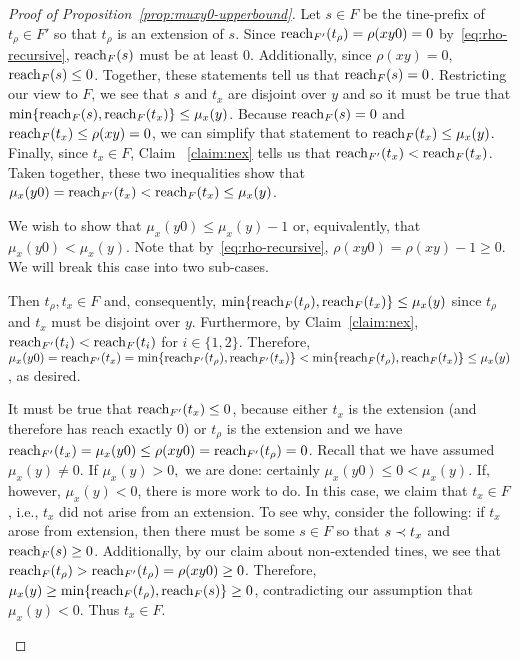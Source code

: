 \begin{proof}[Proof of Proposition~\ref{prop:muxy0-upperbound}]
    Let $s \in F$ be the tine-prefix of $t_\rho \in F'$ so that 
    $t_\rho$ is an extension of $s$. 
    Since $\operatorname{reach}_{F'}(t_\rho) = \rho(xy0) = 0$ by~\eqref{eq:rho-recursive}, 
    $\operatorname{reach}_F(s)$ must be at least 0. 
    Additionally, since $\rho(xy)=0$, $\operatorname{reach}_F(s) \leq 0$. 
    Together, these statements tell us that $\operatorname{reach}_F(s)=0$. 
    Restricting our view to $F$, we see that 
    $s$ and $t_x$ are disjoint over $y$ and 
    so it must be true that 
    $\min\{\operatorname{reach}_F(s),\operatorname{reach}_F(t_x)\} \leq \mu_x(y)$. 
    Because $\operatorname{reach}_F(s)=0$ and $\operatorname{reach}_F(t_x) \leq \rho(xy)=0$, we can simplify that statement to $\operatorname{reach}_F(t_x) \leq \mu_x(y)$. 
    Finally, since $t_x \in F$, 
    Claim ~\ref{claim:nex} tells us that 
    $\operatorname{reach}_{F'}(t_x) < \operatorname{reach}_F(t_x)$. 
    Taken together, these two inequalities show that 
    $\mu_x(y0) = \operatorname{reach}_{F'}(t_x) < \operatorname{reach}_F(t_x) \leq \mu_x(y)$. 


    We wish to show that $\mu_x(y0) \leq \mu_x(y) - 1$ 
    or, equivalently, that $\mu_x(y0) < \mu_x(y)$. 
    Note that by~\ref{eq:rho-recursive}, 
    $\rho(xy0) = \rho(xy) - 1 \geq 0$.
    We will break this case into two sub-cases. 
    \begin{description}[font=\normalfont\itshape\space]
      \item[If both $t_\rho, t_x \in F$.] 
      Then  $t_\rho, t_x \in F$ and, consequently, 
      $\min\{\operatorname{reach}_F(t_\rho),\operatorname{reach}_F(t_x)\} \leq \mu_x(y)$ since $t_\rho$ and $t_x$ must be disjoint over $y$. 
      Furthermore, by Claim~\ref{claim:nex}, 
      $\operatorname{reach}_{F'}(t_i)<\operatorname{reach}_F(t_i)$ for $i\in\{1,2\}$. 
      Therefore, 
      $\mu_x(y0) 
      = \operatorname{reach}_{F'}(t_x) 
      = \min\{\operatorname{reach}_{F'}(t_\rho),\operatorname{reach}_{F'}(t_x)\} 
      < \min\{\operatorname{reach}_{F}(t_\rho),\operatorname{reach}_{F}(t_x)\} 
      \leq\mu_x(y)$, as desired. 

      \item[If either $t_\rho \not \in F$ or $t_x \not \in F$.]
      It must be true that $\operatorname{reach}_{F'}(t_x)\leq 0$, because either $t_x$ is the extension (and therefore has reach exactly 0) or $t_\rho$ is the extension and we have $\operatorname{reach}_{F'}(t_x)=\mu_x(y0)\leq\rho(xy0)=\operatorname{reach}_{F'}(t_\rho)=0$. Recall that we have assumed $\mu_x(y)\neq0$. If $\mu_x(y)>0,$ we are done: certainly $\mu_x(y0)\leq0<\mu_x(y)$. If, however, $\mu_x(y)<0$, there is more work to do. 
      In this case, we claim that $t_x \in F$, i.e., $t_x$ did not arise from an extension. 
      To see why, consider the following: if $t_x$ arose from extension, then there must be some $s \in F$ 
      so that $s \prec t_x$ and $\operatorname{reach}_F(s) \geq 0$. Additionally, by our claim about non-extended tines, we see that 
      $\operatorname{reach}_F(t_\rho)>\operatorname{reach}_{F'}(t_\rho) = \rho(xy0) \geq 0$. 
      Therefore, 
      $\mu_x(y) \geq \min\{\operatorname{reach}_F(t_\rho), \operatorname{reach}_F(s)\} \geq 0$, 
      contradicting our assumption that $\mu_x(y) < 0$. 
      Thus $t_x \in F$. 


\end{description}
\end{proof}
